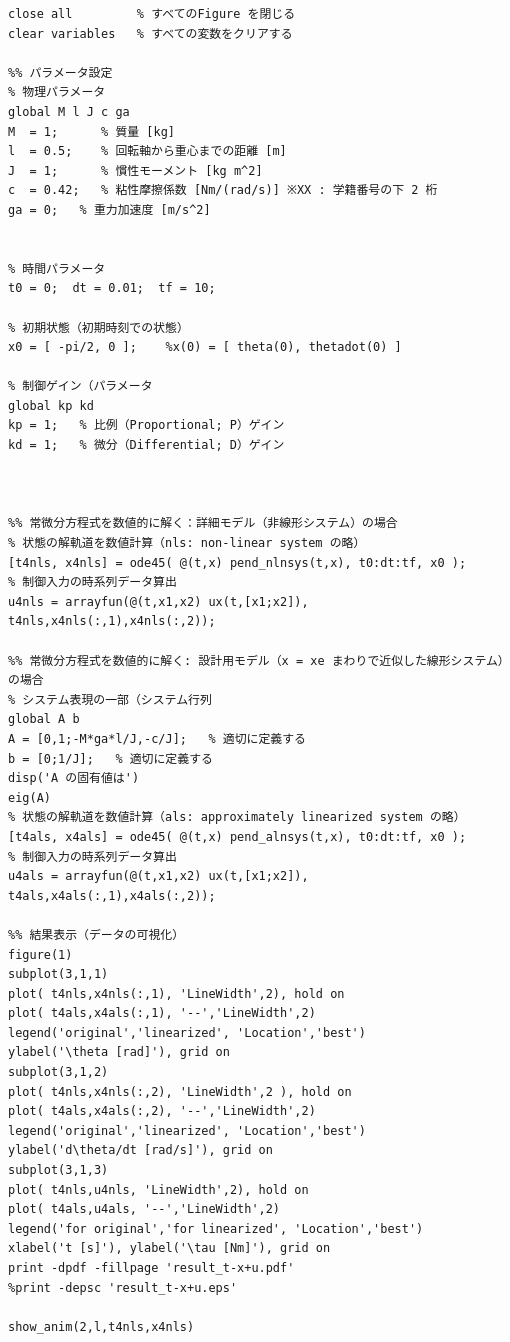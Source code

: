 \documentclass[a4j]{jarticle}
\begin{document}
\begin{lstlisting}[caption=matlab,label=matlab]
close all         % すべてのFigure を閉じる
clear variables   % すべての変数をクリアする
  
%% パラメータ設定
% 物理パラメータ
global M l J c ga
M  = 1;      % 質量 [kg]
l  = 0.5;    % 回転軸から重心までの距離 [m]
J  = 1;      % 慣性モーメント [kg m^2]
c  = 0.42;   % 粘性摩擦係数 [Nm/(rad/s)] ※XX : 学籍番号の下 2 桁
ga = 0;   % 重力加速度 [m/s^2]
  
  
% 時間パラメータ
t0 = 0;  dt = 0.01;  tf = 10;
  
% 初期状態（初期時刻での状態）
x0 = [ -pi/2, 0 ];    %x(0) = [ theta(0), thetadot(0) ]
  
% 制御ゲイン（パラメータ
global kp kd
kp = 1;   % 比例（Proportional; P）ゲイン
kd = 1;   % 微分（Differential; D）ゲイン
  
  
  
%% 常微分方程式を数値的に解く：詳細モデル（非線形システム）の場合
% 状態の解軌道を数値計算（nls: non-linear system の略）
[t4nls, x4nls] = ode45( @(t,x) pend_nlnsys(t,x), t0:dt:tf, x0 );
% 制御入力の時系列データ算出
u4nls = arrayfun(@(t,x1,x2) ux(t,[x1;x2]), t4nls,x4nls(:,1),x4nls(:,2));
  
%% 常微分方程式を数値的に解く: 設計用モデル（x = xe まわりで近似した線形システム）の場合
% システム表現の一部（システム行列
global A b
A = [0,1;-M*ga*l/J,-c/J];   % 適切に定義する
b = [0;1/J];   % 適切に定義する
disp('A の固有値は')
eig(A)
% 状態の解軌道を数値計算（als: approximately linearized system の略）
[t4als, x4als] = ode45( @(t,x) pend_alnsys(t,x), t0:dt:tf, x0 );
% 制御入力の時系列データ算出
u4als = arrayfun(@(t,x1,x2) ux(t,[x1;x2]), t4als,x4als(:,1),x4als(:,2));
  
%% 結果表示（データの可視化）
figure(1)
subplot(3,1,1)
plot( t4nls,x4nls(:,1), 'LineWidth',2), hold on
plot( t4als,x4als(:,1), '--','LineWidth',2)
legend('original','linearized', 'Location','best')
ylabel('\theta [rad]'), grid on
subplot(3,1,2)
plot( t4nls,x4nls(:,2), 'LineWidth',2 ), hold on
plot( t4als,x4als(:,2), '--','LineWidth',2)
legend('original','linearized', 'Location','best')
ylabel('d\theta/dt [rad/s]'), grid on
subplot(3,1,3)
plot( t4nls,u4nls, 'LineWidth',2), hold on
plot( t4als,u4als, '--','LineWidth',2)
legend('for original','for linearized', 'Location','best')
xlabel('t [s]'), ylabel('\tau [Nm]'), grid on
print -dpdf -fillpage 'result_t-x+u.pdf'
%print -depsc 'result_t-x+u.eps'
  
show_anim(2,l,t4nls,x4nls)
  

\end{lstlisting}
\end{document}

